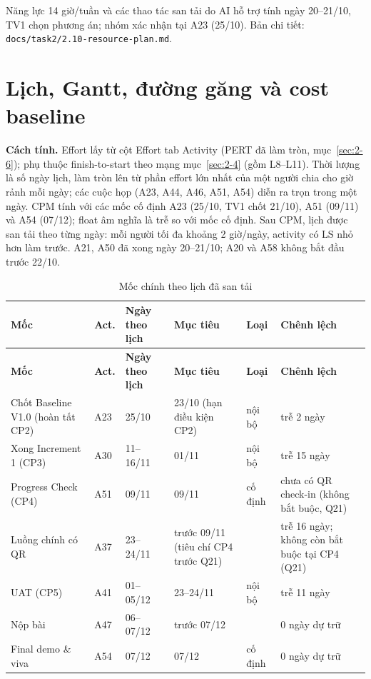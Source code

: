 Năng lực 14 giờ/tuần và các thao tác san tải do AI hỗ trợ tính ngày 20--21/10, TV1 chọn phương án; nhóm xác nhận tại A23 (25/10). Bản chi tiết: \texttt{docs/task2/2.10-resource-plan.md}.

\section{Lịch, Gantt, đường găng và cost baseline}
\label{sec:2-11}
\textbf{Cách tính.} Effort lấy từ cột Effort tab Activity (PERT đã làm tròn, mục~\ref{sec:2-6}); phụ thuộc finish-to-start theo mạng mục~\ref{sec:2-4} (gồm L8--L11). Thời lượng là số ngày lịch, làm tròn lên từ phần effort lớn nhất của một người chia cho giờ rảnh mỗi ngày; các cuộc họp (A23, A44, A46, A51, A54) diễn ra trọn trong một ngày. CPM tính với các mốc cố định A23 (25/10, TV1 chốt 21/10), A51 (09/11) và A54 (07/12); float âm nghĩa là trễ so với mốc cố định. Sau CPM, lịch được san tải theo từng ngày: mỗi người tối đa khoảng 2 giờ/ngày, activity có LS nhỏ hơn làm trước. A21, A50 đã xong ngày 20--21/10; A20 và A58 không bắt đầu trước 22/10.

\begingroup\tblsetup\tblzebra
\begin{longtable}{L{3.6cm}L{1.0cm}L{1.9cm}L{3.0cm}L{1.3cm}L{3.0cm}}
\caption{Mốc chính theo lịch đã san tải}\label{tab:milestones}\\
\toprule
{}\textbf{Mốc} & \textbf{Act.} & \textbf{Ngày theo lịch} & \textbf{Mục tiêu} & \textbf{Loại} & \textbf{Chênh lệch} \\
\midrule
\endfirsthead
\toprule
{}\textbf{Mốc} & \textbf{Act.} & \textbf{Ngày theo lịch} & \textbf{Mục tiêu} & \textbf{Loại} & \textbf{Chênh lệch} \\
\midrule
\endhead
\bottomrule
\endlastfoot
Chốt Baseline V1.0 (hoàn tất CP2) & A23 & 25/10 & 23/10 (hạn điều kiện CP2) & nội bộ & trễ 2 ngày \\
Xong Increment 1 (CP3) & A30 & 11--16/11 & 01/11 & nội bộ & trễ 15 ngày \\
Progress Check (CP4) & A51 & 09/11 & 09/11 & cố định & chưa có QR check-in (không bắt buộc, Q21) \\
Luồng chính có QR & A37 & 23--24/11 & trước 09/11 (tiêu chí CP4 trước Q21) & & trễ 16 ngày; không còn bắt buộc tại CP4 (Q21) \\
UAT (CP5) & A41 & 01--05/12 & 23--24/11 & nội bộ & trễ 11 ngày \\
Nộp bài & A47 & 06--07/12 & trước 07/12 & & 0 ngày dự trữ \\
Final demo \& viva & A54 & 07/12 & 07/12 & cố định & 0 ngày dự trữ \\
\end{longtable}
\endgroup

